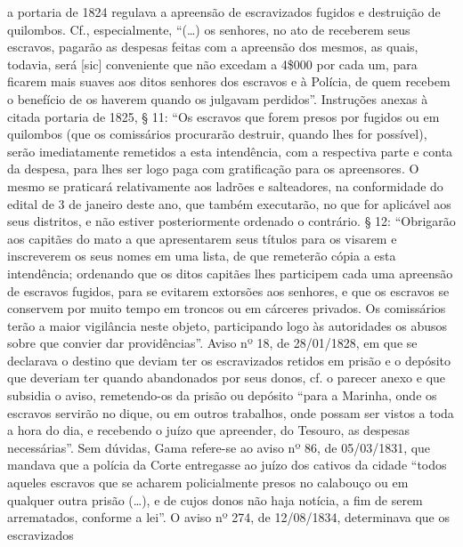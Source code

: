 {  a portaria de 1824 regulava a apreensão de escravizados fugidos e
  destruição de quilombos. Cf., especialmente, ``(\ldots{}) os senhores, no ato
  de receberem seus escravos, pagarão as despesas feitas com a apreensão
  dos mesmos, as quais, todavia, será {[}sic{]} conveniente que não
  excedam a 4\$000 por cada um, para ficarem mais suaves aos ditos
  senhores dos escravos e à Polícia, de quem recebem o benefício de os
  haverem quando os julgavam perdidos''. Instruções anexas à citada
  portaria de 1825, § 11: ``Os escravos que forem presos por fugidos ou
  em quilombos (que os comissários procurarão destruir, quando lhes for
  possível), serão imediatamente remetidos a esta intendência, com a
  respectiva parte e conta da despesa, para lhes ser logo paga com
  gratificação para os apreensores. O mesmo se praticará relativamente
  aos ladrões e salteadores, na conformidade do edital de 3 de janeiro
  deste ano, que também executarão, no que for aplicável aos seus
  distritos, e não estiver posteriormente ordenado o contrário. § 12:
  ``Obrigarão aos capitães do mato a que apresentarem seus títulos para
  os visarem e inscreverem os seus nomes em uma lista, de que remeterão
  cópia a esta intendência; ordenando que os ditos capitães lhes
  participem cada uma apreensão de escravos fugidos, para se evitarem
  extorsões aos senhores, e que os escravos se conservem por muito tempo
  em troncos ou em cárceres privados. Os comissários terão a maior
  vigilância neste objeto, participando logo às autoridades os abusos
  sobre que convier dar providências''. Aviso nº 18, de 28/01/1828, em
  que se declarava o destino que deviam ter os escravizados retidos em
  prisão e o depósito que deveriam ter quando abandonados por seus
  donos, cf. o parecer anexo e que subsidia o aviso, remetendo-os da
  prisão ou depósito ``para a Marinha, onde os escravos servirão no
  dique, ou em outros trabalhos, onde possam ser vistos a toda a hora do
  dia, e recebendo o juízo que apreender, do Tesouro, as despesas
  necessárias''. Sem dúvidas, Gama refere-se ao aviso nº 86, de
  05/03/1831, que mandava que a polícia da Corte entregasse ao juízo dos
  cativos da cidade ``todos aqueles escravos que se acharem
  policialmente presos no calabouço ou em qualquer outra prisão (\ldots{}), e
  de cujos donos não haja notícia, a fim de serem arrematados, conforme
  a lei''. O aviso nº 274, de 12/08/1834, determinava que os escravizados
}
